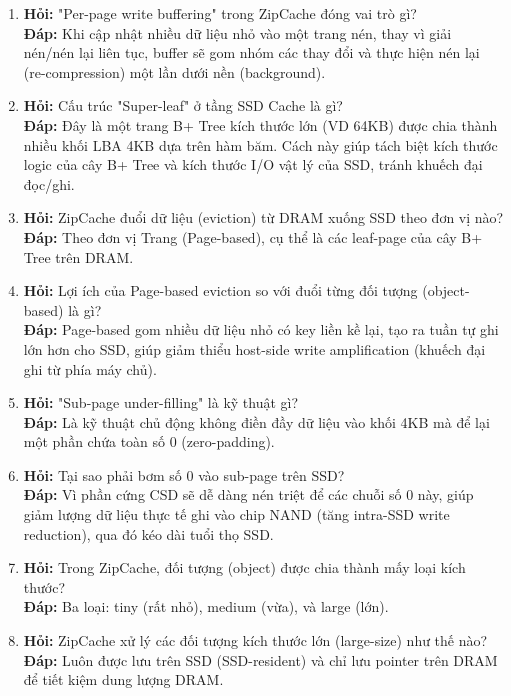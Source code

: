 \documentclass[12pt,a4paper]{article}
\begin{document}
\begin{enumerate}
    \item \textbf{Hỏi:} "Per-page write buffering" trong ZipCache đóng vai trò gì? \\
    \textbf{Đáp:} Khi cập nhật nhiều dữ liệu nhỏ vào một trang nén, thay vì giải nén/nén lại liên tục, buffer sẽ gom nhóm các thay đổi và thực hiện nén lại (re-compression) một lần dưới nền (background).
    
    \item \textbf{Hỏi:} Cấu trúc "Super-leaf" ở tầng SSD Cache là gì? \\
    \textbf{Đáp:} Đây là một trang B+ Tree kích thước lớn (VD 64KB) được chia thành nhiều khối LBA 4KB dựa trên hàm băm. Cách này giúp tách biệt kích thước logic của cây B+ Tree và kích thước I/O vật lý của SSD, tránh khuếch đại đọc/ghi.
    
    \item \textbf{Hỏi:} ZipCache đuổi dữ liệu (eviction) từ DRAM xuống SSD theo đơn vị nào? \\
    \textbf{Đáp:} Theo đơn vị Trang (Page-based), cụ thể là các leaf-page của cây B+ Tree trên DRAM.
    
    \item \textbf{Hỏi:} Lợi ích của Page-based eviction so với đuổi từng đối tượng (object-based) là gì? \\
    \textbf{Đáp:} Page-based gom nhiều dữ liệu nhỏ có key liền kề lại, tạo ra tuần tự ghi lớn hơn cho SSD, giúp giảm thiểu host-side write amplification (khuếch đại ghi từ phía máy chủ).
    
    \item \textbf{Hỏi:} "Sub-page under-filling" là kỹ thuật gì? \\
    \textbf{Đáp:} Là kỹ thuật chủ động không điền đầy dữ liệu vào khối 4KB mà để lại một phần chứa toàn số 0 (zero-padding). 
    
    \item \textbf{Hỏi:} Tại sao phải bơm số 0 vào sub-page trên SSD? \\
    \textbf{Đáp:} Vì phần cứng CSD sẽ dễ dàng nén triệt để các chuỗi số 0 này, giúp giảm lượng dữ liệu thực tế ghi vào chip NAND (tăng intra-SSD write reduction), qua đó kéo dài tuổi thọ SSD.
    
    \item \textbf{Hỏi:} Trong ZipCache, đối tượng (object) được chia thành mấy loại kích thước? \\
    \textbf{Đáp:} Ba loại: tiny (rất nhỏ), medium (vừa), và large (lớn).
    
    \item \textbf{Hỏi:} ZipCache xử lý các đối tượng kích thước lớn (large-size) như thế nào? \\
    \textbf{Đáp:} Luôn được lưu trên SSD (SSD-resident) và chỉ lưu pointer trên DRAM để tiết kiệm dung lượng DRAM.
    

\end{enumerate}
\end{document}
